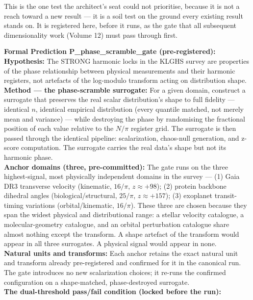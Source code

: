 \documentclass[11pt, letterpaper, openany]{book}
\begin{document}
This is the one test the architect's seat could not prioritise, because it is not a
reach toward a new result --- it is a soil test on the ground every existing result
stands on. It is registered here, before it runs, as the gate that all subsequent
dimensionality work (Volume 12) must pass through first.
 
\begin{predictionbox}
\textbf{Formal Prediction P\_phase\_scramble\_gate (pre-registered):}\\[0.5em]
\textbf{Hypothesis:} The STRONG harmonic locks in the KLGHS survey are properties of
the phase relationship between physical measurements and their harmonic registers,
not artefacts of the log-modulo transform acting on distribution shape.\\[0.5em]
\textbf{Method --- the phase-scramble surrogate:} For a given domain, construct a
surrogate that preserves the real scalar distribution's shape to full fidelity ---
identical $n$, identical empirical distribution (every quantile matched, not merely
mean and variance) --- while destroying the phase by randomising the fractional
position of each value relative to the $N/\pi$ register grid. The surrogate is then
passed through the identical pipeline: scalarization, chaos-null generation, and
z-score computation. The surrogate carries the real data's shape but not its harmonic
phase.\\[0.5em]
\textbf{Anchor domains (three, pre-committed):} The gate runs on the three
highest-signal, most physically independent domains in the survey ---
(1) Gaia DR3 transverse velocity (kinematic, $16/\pi$, $z\approx+98$);
(2) protein backbone dihedral angles (biological/structural, $25/\pi$, $z\approx+157$);
(3) exoplanet transit-timing variations (orbital/kinematic, $16/\pi$).
These three are chosen because they span the widest physical and distributional
range: a stellar velocity catalogue, a molecular-geometry catalogue, and an orbital
perturbation catalogue share almost nothing except the transform. A shape artefact of
the transform would appear in all three surrogates. A physical signal would appear in
none.\\[0.5em]
\textbf{Natural units and transforms:} Each anchor retains the exact natural unit and
transform already pre-registered and confirmed for it in the canonical run. The gate
introduces no new scalarization choices; it re-runs the confirmed configuration on a
shape-matched, phase-destroyed surrogate.\\[0.5em]
\textbf{The dual-threshold pass/fail condition (locked before the run):}

\end{predictionbox}
\end{document}
